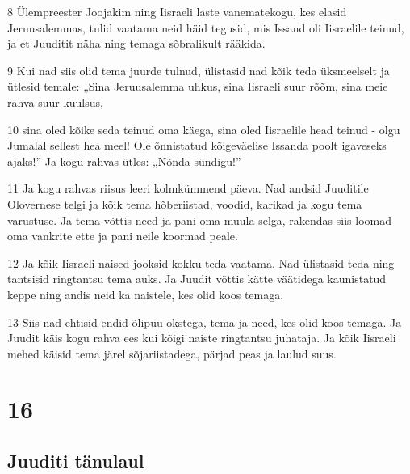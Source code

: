 \par 8 Ülempreester Joojakim ning Iisraeli laste vanematekogu, kes elasid Jeruusalemmas, tulid vaatama neid häid tegusid, mis Issand oli Iisraelile teinud, ja et Juuditit näha ning temaga sõbralikult rääkida.
\par 9 Kui nad siis olid tema juurde tulnud, ülistasid nad kõik teda üksmeelselt ja ütlesid temale: „Sina Jeruusalemma uhkus, sina Iisraeli suur rõõm, sina meie rahva suur kuulsus,
\par 10 sina oled kõike seda teinud oma käega, sina oled Iisraelile head teinud - olgu Jumalal sellest hea meel! Ole õnnistatud kõigeväelise Issanda poolt igaveseks ajaks!” Ja kogu rahvas ütles: „Nõnda sündigu!”
\par 11 Ja kogu rahvas riisus leeri kolmkümmend päeva. Nad andsid Juuditile Olovernese telgi ja kõik tema hõberiistad, voodid, karikad ja kogu tema varustuse. Ja tema võttis need ja pani oma muula selga, rakendas siis loomad oma vankrite ette ja pani neile koormad peale.
\par 12 Ja kõik Iisraeli naised jooksid kokku teda vaatama. Nad ülistasid teda ning tantsisid ringtantsu tema auks. Ja Juudit võttis kätte väätidega kaunistatud keppe ning andis neid ka naistele, kes olid koos temaga.
\par 13 Siis nad ehtisid endid õlipuu okstega, tema ja need, kes olid koos temaga. Ja Juudit käis kogu rahva ees kui kõigi naiste ringtantsu juhataja. Ja kõik Iisraeli mehed käisid tema järel sõjariistadega, pärjad peas ja laulud suus.


\chapter{16}

\section*{Juuditi tänulaul}

